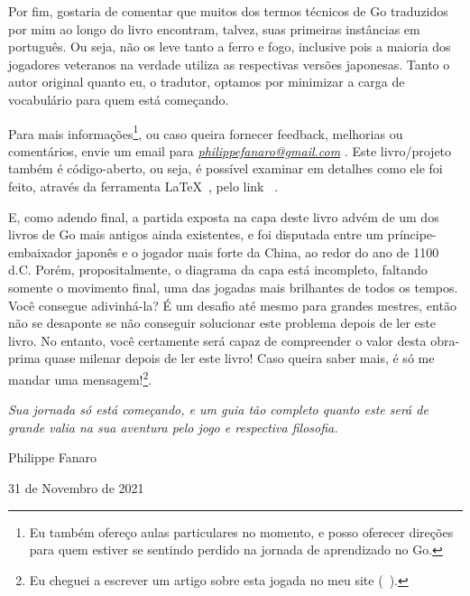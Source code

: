 \pagebreak

Por fim, gostaria de comentar que muitos dos termos técnicos de Go traduzidos por mim ao longo do livro encontram, talvez, suas primeiras instâncias em português. Ou seja, não os leve tanto a ferro e fogo, inclusive pois a maioria dos jogadores veteranos na verdade utiliza as respectivas versões japonesas. Tanto o autor original quanto eu, o tradutor, optamos por minimizar a carga de vocabulário para quem está começando.

\bigskip
\bigskip

Para mais informações\footnote{Eu também ofereço aulas particulares no momento, e posso oferecer direções para quem estiver se sentindo perdido na jornada de aprendizado no Go.}, ou caso queira fornecer feedback, melhorias ou comentários, envie um email para \emph{\href{mailto:philippefanaro@gmail.com}{philippefanaro@gmail.com}} \cite{fanaro_email}. Este livro/projeto também é código-aberto, ou seja, é possível examinar em detalhes como ele foi feito, através da ferramenta \LaTeX~\cite{latex}, pelo link \href{https://github.com/FanaroEngineering/traducao_como_jogar_go}{}~\cite{repo_github}.

E, como adendo final, a partida exposta na capa deste livro advém de um dos livros de Go mais antigos ainda existentes, e foi disputada entre um príncipe-embaixador japonês e o jogador mais forte da China, ao redor do ano de 1100 d.C. Porém, propositalmente, o diagrama da capa está incompleto, faltando somente o movimento final, uma das jogadas mais brilhantes de todos os tempos. Você consegue adivinhá-la? É um desafio até mesmo para grandes mestres, então não se desaponte se não conseguir solucionar este problema depois de ler este livro. No entanto, você certamente será capaz de compreender o valor desta obra-prima quase milenar depois de ler este livro! Caso queira saber mais, é só me mandar uma mensagem!\footnote{Eu cheguei a escrever um artigo sobre esta jogada no meu site (\href{https://fanaro.io/articles/tesuji_mor/tesuji_mor.html}{}~\cite{tesuji_mor}).}.

\bigskip
\bigskip

\emph{Sua jornada só está começando, e um guia tão completo quanto este será de grande valia na sua aventura pelo jogo e respectiva filosofia.}

\bigskip
\bigskip

Philippe Fanaro

31 de Novembro de 2021